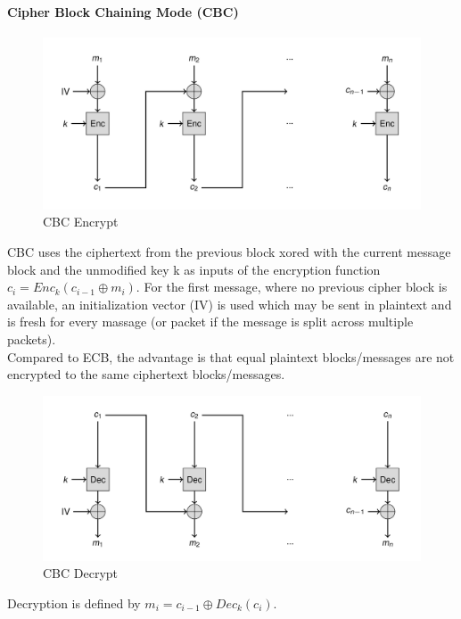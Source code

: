 \paragraph{Cipher Block Chaining Mode (CBC)}
\begin{figure}[H]
  \centering
  \includegraphics[width=.8\textwidth]{figures/cbc_encrypt.png}
  \caption{CBC Encrypt}\label{fig:cbc_encrypt}
\end{figure}
CBC uses the ciphertext from the previous block xored with the current message block and the unmodified key k as inputs of the encryption function $c_i = Enc_k(c_{i-1} \oplus m_i)$.
For the first message, where no previous cipher block is available, an initialization vector (IV) is used which may be sent in plaintext and is fresh for every massage (or packet if the message is split across multiple packets).\\
Compared to ECB, the advantage is that equal plaintext blocks/messages are not encrypted to the same ciphertext blocks/messages.
\begin{figure}[H]
  \centering
  \includegraphics[width=.8\textwidth]{figures/cbc_decrypt.png}
  \caption{CBC Decrypt}
\end{figure}
Decryption is defined by $m_i = c_{i-1} \oplus Dec_k(c_i)$.

